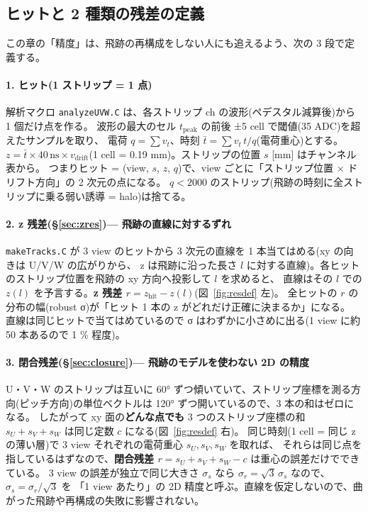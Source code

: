 \documentclass[a4paper,11pt]{ltjsarticle}
\begin{document}
\subsection{ヒットと 2 種類の残差の定義}\label{sec:residual-def}
この章の「精度」は、飛跡の再構成をしない人にも追えるよう、次の 3 段で定義する。

\paragraph{1. ヒット(1 ストリップ = 1 点)}
解析マクロ \texttt{analyzeUVW.C} は、各ストリップ ch の波形(ペデスタル減算後)から 1 個だけ点を作る。
波形の最大のセル $t_\mathrm{peak}$ の前後 ±5 cell で閾値(35 ADC)を超えたサンプルを取り、
電荷 $q = \sum v_t$、時刻 $\bar t = \sum v_t\, t / q$(電荷重心)とする。
$z = \bar t \times 40\,\mathrm{ns} \times v_\mathrm{drift}$(1 cell = 0.19 mm)。ストリップの位置 $s$ [mm] はチャンネル表から。
つまりヒット = (view, $s$, $z$, $q$)で、view ごとに「ストリップ位置 × ドリフト方向」の 2 次元の点になる。
$q < 2000$ のストリップ(飛跡の時刻に全ストリップに乗る弱い誘導 = halo)は捨てる。

\paragraph{2. z 残差(§\ref{sec:zres})— 飛跡の直線に対するずれ}
\texttt{makeTracks.C} が 3 view のヒットから 3 次元の直線を 1 本当てはめる(xy の向きは U/V/W の広がりから、
z は飛跡に沿った長さ $l$ に対する直線)。各ヒットのストリップ位置を飛跡の xy 方向へ投影して $l$ を求めると、
直線はその $l$ での $z(l)$ を予言する。\textbf{z 残差 $r = z_\mathrm{hit} - z(l)$}(図~\ref{fig:resdef} 左)。
全ヒットの $r$ の分布の幅(robust σ)が「ヒット 1 本の z がどれだけ正確に決まるか」になる。
直線は同じヒットで当てはめているので σ はわずかに小さめに出る(1 view に約 50 本あるので 1 \% 程度)。

\paragraph{3. 閉合残差(§\ref{sec:closure})— 飛跡のモデルを使わない 2D の精度}
U・V・W のストリップは互いに 60° ずつ傾いていて、ストリップ座標を測る方向(ピッチ方向)の単位ベクトルは 120° ずつ開いているので、3 本の和はゼロになる。
したがって xy 面の\textbf{どんな点でも} 3 つのストリップ座標の和 $s_U + s_V + s_W$ は同じ定数 $c$ になる(図~\ref{fig:resdef} 右)。
同じ時刻(1 cell = 同じ z の薄い層)で 3 view それぞれの電荷重心 $s_U, s_V, s_W$ を取れば、
それらは同じ点を指しているはずなので、\textbf{閉合残差 $r = s_U + s_V + s_W - c$} は重心の誤差だけでできている。
3 view の誤差が独立で同じ大きさ $\sigma_s$ なら $\sigma_r = \sqrt{3}\,\sigma_s$ なので、$\sigma_s = \sigma_r / \sqrt{3}$ を
「1 view あたり」の 2D 精度と呼ぶ。直線を仮定しないので、曲がった飛跡や再構成の失敗に影響されない。
\end{document}
